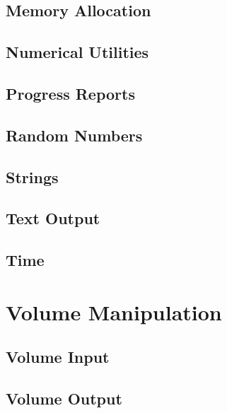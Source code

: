 \subsection{Memory Allocation}

\subsection{Numerical Utilities}

\subsection{Progress Reports}

\subsection{Random Numbers}

\subsection{Strings}

\subsection{Text Output}

\subsection{Time}

\section{Volume Manipulation}

\subsection{Volume Input}

\subsection{Volume Output}


